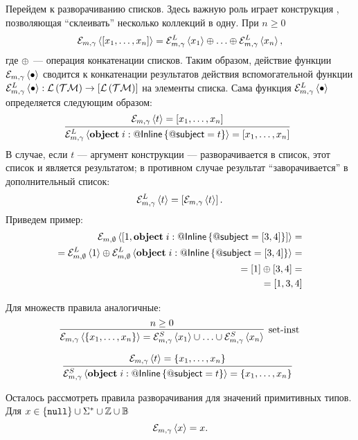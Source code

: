 Перейдем к разворачиванию списков. Здесь важную роль играет конструкция , позволяющая ``склеивать'' несколько коллекций в одну. При $n \ge 0$
$$
\mathcal{E}_{m, \gamma} \left\langle \left[x_1, \ldots, x_n\right] \right\rangle = \mathcal{E}_{m, \gamma}^{L} \left\langle x_1 \right\rangle \oplus \ldots \oplus \mathcal{E}_{m, \gamma}^{L} \left\langle x_n \right\rangle,
$$ 
где $\oplus$ --- операция конкатенации списков. Таким образом, действие функции $\mathcal{E}_{m, \gamma} \left\langle \bullet \right\rangle$ сводится к конкатенации результатов действия вспомогательной функции $\mathcal{E}_{m, \gamma}^{L} \left\langle \bullet \right\rangle : \mathcal{L}\left(\mathcal{TM}\right) \rightarrow \left[\mathcal{L}\left(\mathcal{TM}\right)\right]$ на элементы списка. Сама функция $\mathcal{E}_{m, \gamma}^{L} \left\langle \bullet \right\rangle$ определяется следующим образом:
$$
\trule{
\Inst{\gamma}{t} = \List{x_1, \ldots, x_n}
}{
	\InstL{\gamma}{\Object{i}{\RefSt{Inline}}{\RefSt{subject} = t}} = \List{x_1, \ldots, x_n}
}{}
$$
В случае, если $t$ --- аргумент конструкции  --- разворачивается в список, этот список и является результатом; в противном случае результат ``заворачивается'' в дополнительный список:
$$
	\mathcal{E}_{m, \gamma}^{L} \left\langle t \right\rangle = \left[\mathcal{E}_{m, \gamma} \left\langle t \right\rangle\right].
$$ 
Приведем пример:
\begin{align*}
	\mathcal{E}_{m, \emptyset} \left\langle \left[1, \mathbf{object}\;i : @\mathsf{Inline}\left\{ @\mathsf{subject} = \left[3, 4\right] \right\}\right] \right\rangle = \\
=	\mathcal{E}_{m, \emptyset}^{L} \left\langle 1 \right\rangle \oplus \mathcal{E}_{m, \emptyset}^{L} \left\langle \mathbf{object}\;i : @\mathsf{Inline}\left\{ @\mathsf{subject} = \left[3, 4\right] \right\} \right\rangle = \\
=	\left[1\right] \oplus \left[3, 4\right] = \\
=	\left[1, 3, 4\right]
\end{align*}

Для множеств правила аналогичные:
$$
\trule{
n \ge 0
}{
	\Inst{\gamma}{\Set{x_1, \ldots, x_n}} = \InstS{\gamma}{x_1} \cup \ldots \cup \InstS{\gamma}{x_n}
}{set-inst}
$$ 

$$
\trule{
\Inst{\gamma}{t} = \Set{x_1, \ldots, x_n}
}{
	\InstS{\gamma}{\Object{i}{\RefSt{Inline}}{\RefSt{subject} = t}} = \Set{x_1, \ldots, x_n}
}{}
$$ 

Осталось рассмотреть правила разворачивания для значений примитивных типов. Для $x \in \{\mathtt{null}\} \cup  \Sigma^* \cup \mathbb{Z} \cup \mathbb{B}$
$$
	\mathcal{E}_{m, \gamma} \left\langle x \right\rangle = x.
$$


